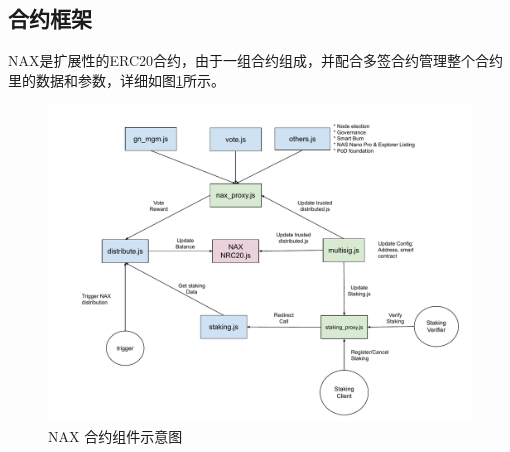 \subsection{合约框架}
NAX是扩展性的ERC20合约，由于一组合约组成，并配合多签合约管理整个合约里的数据和参数，详细如图\ref{fig:nax_framework}所示。

\begin{figure}[htbp]
  \centering
    \includegraphics[width=1\textwidth]{../common/nax.pdf}
    \caption{NAX 合约组件示意图 \label{fig:nax_framework}}
\end{figure}